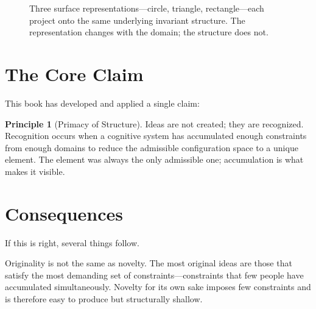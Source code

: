 \documentclass[11pt]{book}
\theoremstyle{plain}
\theoremstyle{definition}
\newtheorem{principle}[theorem]{Principle}
\theoremstyle{remark}
\begin{document}
\begin{figure}[h]
\centering
{}
\caption{Three surface representations---circle, triangle, rectangle---each project onto
the same underlying invariant structure. The representation changes with the domain;
the structure does not.}
\end{figure}

\section{The Core Claim}

This book has developed and applied a single claim:

\begin{principle}[Primacy of Structure]
Ideas are not created; they are recognized. Recognition occurs when a
cognitive system has accumulated enough constraints from enough domains
to reduce the admissible configuration space to a unique element. The
element was always the only admissible one; accumulation is what makes
it visible.
\end{principle}

\section{Consequences}

If this is right, several things follow.

Originality is not the same as novelty. The most original ideas are those
that satisfy the most demanding set of constraints---constraints that few
people have accumulated simultaneously. Novelty for its own sake imposes
few constraints and is therefore easy to produce but structurally shallow.
\end{document}
